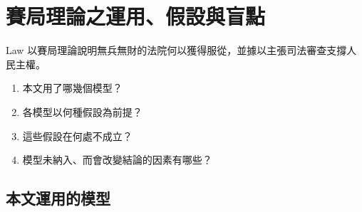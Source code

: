 \chapter{賽局理論之運用、假設與盲點}
\label{ch:20_game}

\begin{qaquestion}
Law 以賽局理論說明無兵無財的法院何以獲得服從，並據以主張司法審查支撐人民主權。
\begin{enumerate}
\tightlist
\item 本文用了哪幾個模型？
\item 各模型以何種假設為前提？
\item 這些假設在何處不成立？
\item 模型未納入、而會改變結論的因素有哪些？
\end{enumerate}
\end{qaquestion}

\section{本文運用的模型}
\label{sec:20_game-1}

